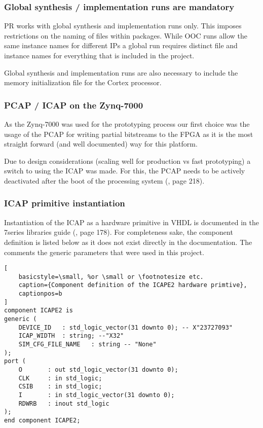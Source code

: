 \subsubsection{Global synthesis / implementation runs are mandatory}
\gls{PR} works with global synthesis and implementation runs only.
This imposes restrictions on the naming of files within packages. 
While \gls{OOC} runs allow the same instance names for different IPs a global run requires distinct file and instance names for everything that is included in the project.

Global synthesis and implementation runs are also necessary to include the memory initialization file for the Cortex processor. 

\subsubsection{\gls{PCAP} / \gls{ICAP} on the Zynq-7000}
As the Zynq-7000 was used for the prototyping process our first choice was the usage of the \gls{PCAP} for writing partial bitstreams to the \gls{FPGA} as it is the most straight forward (and well documented) way for this platform.

Due to design considerations (scaling well for production vs fast prototyping) a switch to using the \gls{ICAP} was made.
For this, the \gls{PCAP} needs to be actively deactivated after the boot of the processing system (\cite{zynq_7000_technical_manual}, page 218).

\subsubsection{\gls{ICAP} primitive instantiation}
Instantiation of the \gls{ICAP} as a hardware primitive in VHDL is documented in the 7series libraries guide (\cite{7series_libraries_guide}, page 178).
For completeness sake, the component definition is listed below as it does not exist directly in the documentation.
The comments the generic parameters that were used in this project.
\lstset{language=vhdl}
\begin{lstlisting}[
    basicstyle=\small, %or \small or \footnotesize etc.
    caption={Component definition of the ICAPE2 hardware primtive},
    captionpos=b
]
component ICAPE2 is
generic (
    DEVICE_ID   : std_logic_vector(31 downto 0); -- X"23727093" 
    ICAP_WIDTH  : string; --"X32"
    SIM_CFG_FILE_NAME 	: string -- "None"
);   
port (
    O 		: out std_logic_vector(31 downto 0);
    CLK 	: in std_logic;
    CSIB 	: in std_logic;
    I 		: in std_logic_vector(31 downto 0);
    RDWRB 	: inout std_logic
);
end component ICAPE2;
\end{lstlisting}
